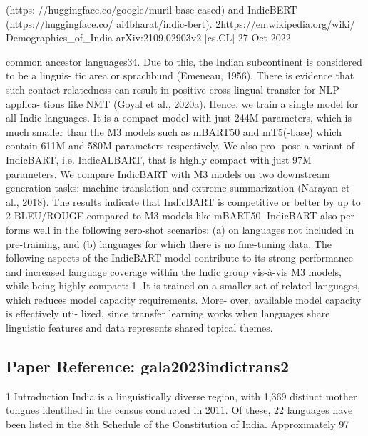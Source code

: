 (https: //huggingface.co/google/muril-base-cased) and IndicBERT (https://huggingface.co/ ai4bharat/indic-bert). 2https://en.wikipedia.org/wiki/ Demographics_of_India arXiv:2109.02903v2 [cs.CL] 27 Oct 2022

common ancestor languages34. Due to this, the Indian subcontinent is considered to be a linguis- tic area or sprachbund (Emeneau, 1956). There is evidence that such contact-relatedness can result in positive cross-lingual transfer for NLP applica- tions like NMT (Goyal et al., 2020a). Hence, we train a single model for all Indic languages. It is a compact model with just 244M parameters, which is much smaller than the M3 models such as mBART50 and mT5(-base) which contain 611M and 580M parameters respectively. We also pro- pose a variant of IndicBART, i.e. IndicALBART, that is highly compact with just 97M parameters. We compare IndicBART with M3 models on two downstream generation tasks: machine translation and extreme summarization (Narayan et al., 2018). The results indicate that IndicBART is competitive or better by up to 2 BLEU/ROUGE compared to M3 models like mBART50. IndicBART also per- forms well in the following zero-shot scenarios: (a) on languages not included in pre-training, and (b) languages for which there is no ﬁne-tuning data. The following aspects of the IndicBART model contribute to its strong performance and increased language coverage within the Indic group vis-à-vis M3 models, while being highly compact: 1. It is trained on a smaller set of related languages, which reduces model capacity requirements. More- over, available model capacity is effectively uti- lized, since transfer learning works when languages share linguistic features and data represents shared topical themes.

\vspace{18pt}


\subsection*{Paper Reference: gala2023indictrans2}

1 Introduction India is a linguistically diverse region, with 1,369 distinct mother tongues identified in the census conducted in 2011. Of these, 22 languages have been listed in the 8th Schedule of the Constitution of India. Approximately 97%

